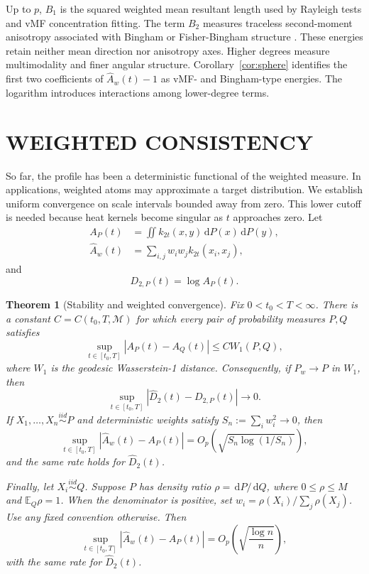 \documentclass[twoside]{article}
\newtheorem{theorem}{Theorem}
\theoremstyle{definition}
\theoremstyle{remark}
\newcommand{\E}{\mathbb{E}}
\newcommand{\M}{\mathcal{M}}
\newcommand{\dd}{\,\mathrm{d}}
\begin{document}
Up to $p$, $B_1$ is the squared weighted mean resultant length used by Rayleigh tests and vMF concentration fitting. The term $B_2$ measures traceless second-moment anisotropy associated with Bingham or Fisher-Bingham structure \citep{kent_1982_FisherBinghamDistributionSphere}. These energies retain neither mean direction nor anisotropy axes. Higher degrees measure multimodality and finer angular structure. Corollary~\ref{cor:sphere} identifies the first two coefficients of $\widehat A_w(t)-1$ as vMF- and Bingham-type energies. The logarithm introduces interactions among lower-degree terms.


\section{WEIGHTED CONSISTENCY}


So far, the profile has been a deterministic functional of the weighted measure. In applications, weighted atoms may approximate a target distribution. We establish uniform convergence on scale intervals bounded away from zero. This lower cutoff is needed because heat kernels become singular as $t$ approaches zero. Let
\begin{align*}
  A_P(t)&=\iint k_{2t}(x,y)\dd P(x)\dd P(y),  \\
  \widehat A_w(t)&=\sum_{i,j}w_iw_jk_{2t}(x_i,x_j),
\end{align*}
and
\begin{equation*}
    D_{2,P}(t)=\log A_P(t).
\end{equation*}

\begin{theorem}[Stability and weighted convergence]
\label{thm:consistency}
Fix $0<t_0<T<\infty$. There is a constant $C=C(t_0,T,\M)$ for which every pair of probability measures $P,Q$ satisfies
\begin{equation}
  \sup_{t\in[t_0,T]} |A_P(t)-A_Q(t)|
  \le C W_1(P,Q),
  \label{eq:W1_stability}
\end{equation}
where $W_1$ is the geodesic Wasserstein-1 distance. Consequently, if $\widehat P_w\to P$ in $W_1$, then
\begin{equation*}
  \sup_{t\in[t_0,T]} |\widehat D_2(t)-D_{2,P}(t)|\to0.
\end{equation*}
If $X_1,\ldots,X_n\overset{iid}{\sim}P$ and deterministic weights satisfy $S_n:=\sum_iw_i^2\to0$, then
\begin{equation}
  \sup_{t\in[t_0,T]} |\widehat A_w(t)-A_P(t)|
  =O_p\left(\sqrt{S_n\log(1/S_n)}\right),
  \label{eq:weighted_rate}
\end{equation}
and the same rate holds for $\widehat D_2(t)$.

Finally, let $X_i\overset{iid}{\sim}Q$. Suppose $P$ has density ratio $\rho=\dd P/\dd Q$, where $0\le\rho\le M$ and $\E_Q\rho=1$. When the denominator is positive, set $w_i=\rho(X_i)/\sum_j\rho(X_j)$. Use any fixed convention otherwise. Then
\begin{equation*}
  \sup_{t\in[t_0,T]} |\widehat A_w(t)-A_P(t)|=O_p\left(\sqrt{\frac{\log n}{n}}\right),
\end{equation*}
with the same rate for $\widehat D_2(t)$.
\end{theorem}
\end{document}
